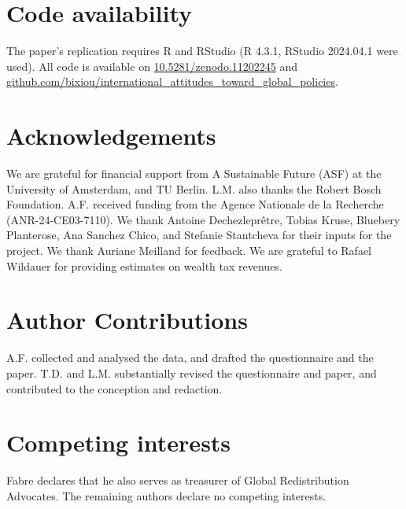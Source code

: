\documentclass[12pt,english]{article}
\begin{document}
\begin{small}
\section*{\normalsize Code availability}

The paper's replication requires R and RStudio (R 4.3.1, RStudio 2024.04.1 were used). All code is available on \href{https://zenodo.org/doi/10.5281/zenodo.11202245}{10.5281/zenodo.11202245} and \href{https://github.com/bixiou/international_attitudes_toward_global_policies}{github.com/bixiou/international\_attitudes\_toward\_global\_policies}. %

\section*{\normalsize Acknowledgements}

We are grateful for financial support from A Sustainable Future (ASF) at the University of Amsterdam, and TU Berlin. L.M. also thanks the Robert Bosch Foundation. A.F. received funding from the Agence Nationale de la Recherche (ANR-24-CE03-7110). %
We thank Antoine Dechezleprêtre, Tobias Kruse, Bluebery Planterose, Ana Sanchez Chico, and Stefanie Stantcheva for their inputs for the project. We thank Auriane Meilland for feedback. We are grateful to Rafael Wildauer for providing estimates on wealth tax revenues. %

\section*{\normalsize Author Contributions} A.F. collected and analysed the data, and drafted the questionnaire and the paper. T.D. and L.M. substantially revised the questionnaire and paper, and contributed to the conception and redaction.

\section*{\normalsize Competing interests} Fabre declares that he also serves as treasurer of Global Redistribution Advocates. The remaining authors declare no competing interests. %
\end{small}  %

\begin{table}[h]
  \caption[List experiment: tacit support for the GCS]{Number of supported policies in the list experiment depending on the presence of the Global Climate Scheme (GCS) in the list. %
   The tacit support for the GCS is estimated by regressing the number of supported policies on the presence of the GCS in the list of policies. The social desirability is estimated as the difference-in-means between the tacit and stated support (see ), and it is not significantly different from zero even at a 20\% threshold (as shown by the 80\% Confidence Interval). 
  }\label{tab:list_exp}
  \makebox[\textwidth][c]{
  }  
\end{table}
\end{document}
